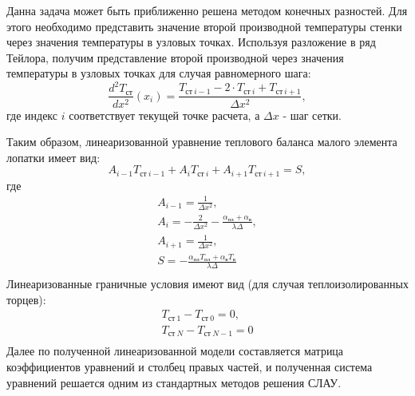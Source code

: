 \documentclass[a4paper,12pt]{article}
\begin{document}
    Данна задача может быть приближенно решена методом конечных разностей.
    Для этого необходимо представить значение второй производной температуры стенки через значения температуры в
    узловых точках.
    Используя разложение в ряд Тейлора, получим представление второй производной через значения температуры в
    узловых точках для случая равномерного шага:
    \[
        \frac{d^2 T_{ст}}{dx^2}(x_i) = \frac{T_{ст\ i-1} - 2 \cdot T_{ст\ i} + T_{ст\ i+1}}{\Delta x^2},
    \]
    где индекс $i$ соответствует текущей точке расчета, а $\Delta x$ - шаг сетки.

    Таким образом, линеаризованной уравнение теплового баланса малого элемента лопатки имеет вид:
    \[
        A_{i-1} T_{ст\ i-1} + A_{i} T_{ст\ i} + A_{i+1} T_{ст\ i+1} = S,
    \]
    где
    \begin{gather*}
        A_{i-1} = \frac{1}{\Delta x^2},\\
        A_i = -\frac{2}{\Delta x^2} - \frac{\alpha_{пл} + \alpha_в}{\lambda \Delta},\\
        A_{i+1} =\frac{1}{\Delta x^2},\\
        S = - \frac{\alpha_{пл} T_{пл} + \alpha_в T_в}{\lambda \Delta}\\
    \end{gather*}
    Линеаризованные граничные условия имеют вид (для случая теплоизолированных торцев):
    \begin{gather*}
        T_{ст\ 1} - T_{ст\ 0} = 0,\\
        T_{ст\ N} - T_{ст\ N-1} = 0\\
    \end{gather*}
    Далее по полученной линеаризованной модели составляется матрица коэффициентов уравнений и столбец правых частей,
    и полученная система уравнений решается одним из стандартных методов решения СЛАУ.

%    
\end{document}
